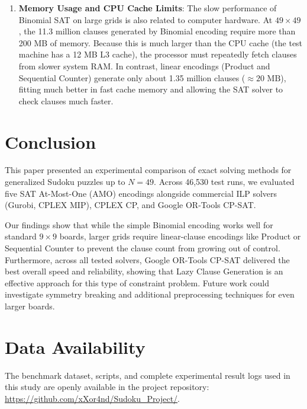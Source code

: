\documentclass[a4paper,fleqn]{cas-sc}
\begin{document}
\begin{enumerate}
    \item \textbf{Memory Usage and CPU Cache Limits}: The slow performance of Binomial SAT on large grids is also related to computer hardware. At $49 \times 49$, the 11.3 million clauses generated by Binomial encoding require more than 200 MB of memory. Because this is much larger than the CPU cache (the test machine has a 12 MB L3 cache), the processor must repeatedly fetch clauses from slower system RAM. In contrast, linear encodings (Product and Sequential Counter) generate only about 1.35 million clauses ($\approx 20\text{ MB}$), fitting much better in fast cache memory and allowing the SAT solver to check clauses much faster.
\end{enumerate}

\clearpage
\section{Conclusion}
\label{sec:conclusion}

This paper presented an experimental comparison of exact solving methods for generalized Sudoku puzzles up to $N = 49$. Across 46,530 test runs, we evaluated five SAT At-Most-One (AMO) encodings alongside commercial ILP solvers (Gurobi, CPLEX MIP), CPLEX CP, and Google OR-Tools CP-SAT.

Our findings show that while the simple Binomial encoding works well for standard $9 \times 9$ boards, larger grids require linear-clause encodings like Product or Sequential Counter to prevent the clause count from growing out of control. Furthermore, across all tested solvers, Google OR-Tools CP-SAT delivered the best overall speed and reliability, showing that Lazy Clause Generation is an effective approach for this type of constraint problem. Future work could investigate symmetry breaking and additional preprocessing techniques for even larger boards.

\section*{Data Availability}
The benchmark dataset, scripts, and complete experimental result logs used in this study are openly available in the project repository: \url{https://github.com/xXor4nd/Sudoku_Project/}.
\end{document}
